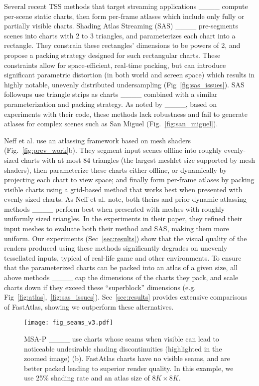 Several recent TSS methods that target streaming applications ____ compute per-scene static charts, then form per-frame atlases which include only fully or partially visible charts. Shading Atlas Streaming (SAS) ____ pre-segments scenes into charts with 2 to 3 triangles, and parameterizes each chart into a rectangle. They constrain these rectangles' dimensions to be powers of 2, and propose a packing strategy designed for such rectangular charts. These constraints allow for space-efficient, real-time packing, but can introduce significant parametric distortion (in both world and screen space) which results in highly notable, unevenly distributed  undersampling (Fig~\ref{fig:sas_issues}). SAS followups use triangle strips as charts ____ combined with a similar parameterization and packing strategy. As noted by ____, based on experiments with their code, these methods lack robustness and fail to generate atlases for complex scenes such as San Miguel (Fig.~\ref{fig:san_miguel}). 

Neff et al.  use an atlassing framework based on mesh shaders (Fig.~\ref{fig:prev_work}b).
They segment input scenes offline into roughly evenly-sized charts with at most 84 triangles (the largest meshlet size supported by mesh shaders), then parameterize these charts either offline, or dynamically by projecting each chart to view space; and finally form per-frame atlases by packing visible charts using a grid-based method that works best when presented with evenly sized charts. 
As Neff et al. note, both theirs and prior dynamic atlassing methods ____ perform best when presented with meshes with roughly uniformly sized triangles. In the experiments in their paper, they refined their input meshes to evaluate both their method and SAS, making them more uniform. Our experiments (Sec~\ref{sec:results}) show that the visual quality of the renders produced using these methods significantly degrades on unevenly tessellated inputs, typical of real-life game and other environments. 
To ensure that the parameterized charts can be packed into an atlas of a given size, all above methods  ____ cap the dimensions of the charts they pack, and scale charts down if they exceed these ``superblock'' dimensions (e.g. Fig~\ref{fig:atlas},~\ref{fig:sas_issues}). Sec~\ref{sec:results} provides extensive comparisons of FastAtlas, showing we outperform these alternatives. 

\begin{figure}
\texttt{[image: fig\_seams\_v3.pdf]}
\caption{MSA-P ____ use charts whose seams when visible can lead to noticeable undesirable shading discontinuities (highlighted in the zoomed image)  (b). FastAtlas charts have no visible seams, and are better packed leading to superior render quality. In this example, we use 25\% shading rate and an atlas size of $8K \times 8K$.}
\label{fig:seams}
\vspace{-5mm}
\end{figure}

